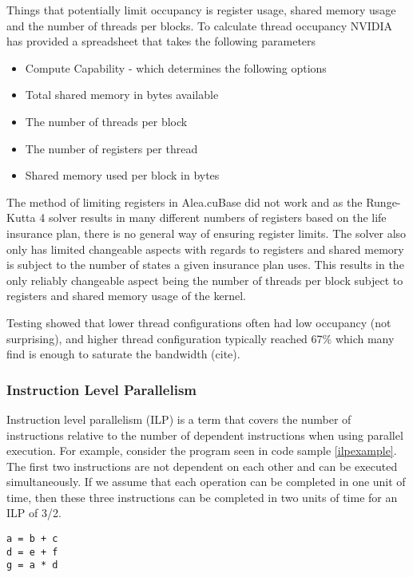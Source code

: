 Things that potentially limit occupancy is register usage, shared memory usage and the number of threads per blocks.
To calculate thread occupancy NVIDIA has provided a spreadsheet that takes the following parameters
\begin{itemize}
\item Compute Capability - which determines the following options
\item Total shared memory in bytes available
\item The number of threads per block
\item The number of registers per thread
\item Shared memory used per block in bytes
\end{itemize}

The method of limiting registers in Alea.cuBase did not work and as the Runge-Kutta 4 solver results in many different numbers of registers based on the life insurance plan, there is no general way of ensuring register limits.
The solver also only has limited changeable aspects with regards to registers and shared memory is subject to the number of states a given insurance plan uses.
This results in the only reliably changeable aspect being the number of threads per block subject to registers and shared memory usage of the kernel.

Testing showed that lower thread configurations often had low occupancy (not surprising), and higher thread configuration typically reached 67\% which many find is enough to saturate the bandwidth (cite).

\subsubsection{Instruction Level Parallelism}\label{subsubsec:ilp}
Instruction level parallelism (ILP) is a term that covers the number of instructions relative to the number of dependent instructions when using parallel execution.
For example, consider the program seen in code sample \ref{ilpexample}.
The first two instructions are not dependent on each other and can be executed simultaneously.
If we assume that each operation can be completed in one unit of time, then these three instructions can be completed in two units of time for an ILP of 3/2.

\begin{lstlisting}[caption=ILP example program, label=ilpexample]
a = b + c
d = e + f
g = a * d
\end{lstlisting}

